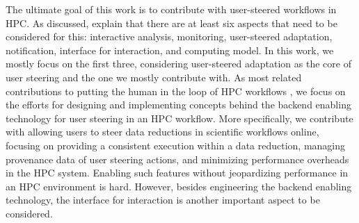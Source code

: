 The ultimate goal of this work is to contribute with user-steered
workflows in HPC. As discussed, \citet{Mattoso2015Dynamic} explain that there are at least
six aspects that need to be considered for this: interactive analysis,
monitoring, user-steered adaptation, notification, interface for interaction,
and computing model.
In this work, we mostly focus on the
first three, considering user-steered adaptation as the core of user
steering and the one we mostly contribute with. As most related
contributions to putting the human in the loop of HPC workflows \cite{Nguyen2015WorkWays:,Mattoso2015Dynamic,Dias2015Data-centric}, we focus on the efforts for designing and implementing concepts behind the backend
enabling technology for user steering in an HPC workflow.
More
specifically, we contribute with allowing users to steer data
reductions in scientific workflows online, focusing on providing a
consistent execution within a data reduction, managing provenance data
of user steering actions, and minimizing performance overheads in the
HPC system. Enabling such features without
jeopardizing performance in an HPC environment is hard.
However, besides engineering the backend enabling technology, the
interface for interaction is another important aspect to be considered.

